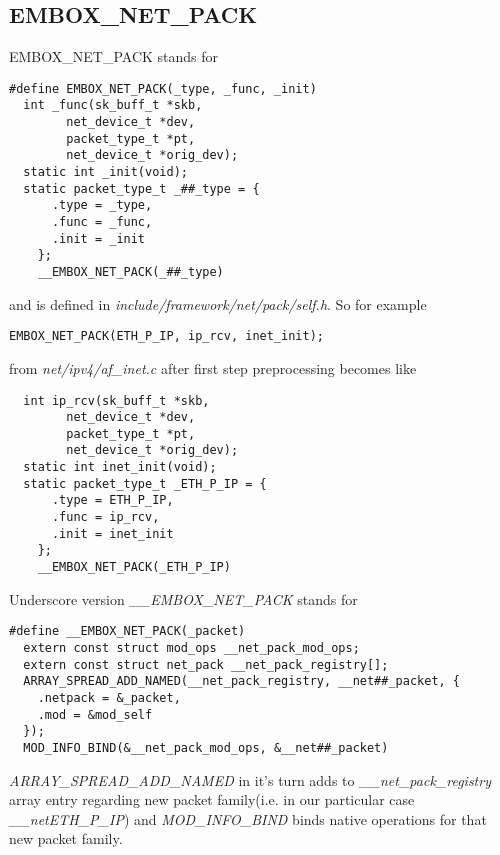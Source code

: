 \documentclass[12pt,a4paper]{article}
\begin{document}
\subsection{EMBOX\_NET\_PACK}
\label{sec:embox_net_pack}
EMBOX\_NET\_PACK stands for 
\begin{verbatim}
#define EMBOX_NET_PACK(_type, _func, _init)    
  int _func(sk_buff_t *skb,                   
        net_device_t *dev,                     
        packet_type_t *pt,                    
        net_device_t *orig_dev);              
  static int _init(void);                     
  static packet_type_t _##_type = {           
      .type = _type,                          
      .func = _func,                          
      .init = _init                            
    };                                        
    __EMBOX_NET_PACK(_##_type)
\end{verbatim}
and is defined in {\it include/framework/net/pack/self.h}. So for example
\begin{verbatim}
EMBOX_NET_PACK(ETH_P_IP, ip_rcv, inet_init);
\end{verbatim}
from {\it net/ipv4/af\_inet.c} after first step preprocessing becomes like
\begin{verbatim}
  int ip_rcv(sk_buff_t *skb,                   
        net_device_t *dev,                     
        packet_type_t *pt,                    
        net_device_t *orig_dev);              
  static int inet_init(void);                 
  static packet_type_t _ETH_P_IP = {           
      .type = ETH_P_IP,                        
      .func = ip_rcv,                          
      .init = inet_init                        
    };                                        
    __EMBOX_NET_PACK(_ETH_P_IP)
\end{verbatim}
Underscore version {\it \_\_EMBOX\_NET\_PACK} stands for
\begin{verbatim}
#define __EMBOX_NET_PACK(_packet)                                  
  extern const struct mod_ops __net_pack_mod_ops;                   
  extern const struct net_pack __net_pack_registry[];               
  ARRAY_SPREAD_ADD_NAMED(__net_pack_registry, __net##_packet, {    
    .netpack = &_packet,                                           
    .mod = &mod_self                                               
  });                                                               
  MOD_INFO_BIND(&__net_pack_mod_ops, &__net##_packet)
\end{verbatim}
{\it ARRAY\_SPREAD\_ADD\_NAMED} in it's turn adds to
{\it \_\_net\_pack\_registry} array entry regarding new packet family(i.e. in
our particular case {\it \_\_netETH\_P\_IP}) and {\it MOD\_INFO\_BIND}
binds native operations for that new packet family.
\end{document}
